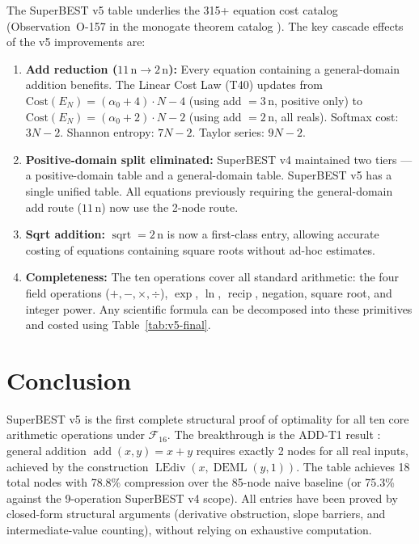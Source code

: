 \documentclass[12pt,a4paper]{article}
\theoremstyle{definition}
\newcommand{\DEML}{\operatorname{DEML}}
\newcommand{\LEdiv}{\operatorname{LEdiv}}
\newcommand{\recip}{\operatorname{recip}}
\newcommand{\addop}{\operatorname{add}}
\newcommand{\sqrtop}{\operatorname{sqrt}}
\begin{document}
The SuperBEST v5 table underlies the 315+ equation cost catalog
(Observation~O-157 in the monogate theorem catalog \cite{MonogateCatalog}).
The key cascade effects of the v5 improvements are:

\begin{enumerate}
\item \textbf{Add reduction ($11\,\text{n} \to 2\,\text{n}$):}
  Every equation containing a general-domain addition benefits.
  The Linear Cost Law (T40) updates from
  $\mathrm{Cost}(E_N) = (\alpha_0 + 4) \cdot N - 4$ (using add $= 3\,\text{n}$, positive only)
  to
  $\mathrm{Cost}(E_N) = (\alpha_0 + 2) \cdot N - 2$ (using add $= 2\,\text{n}$, all reals).
  Softmax cost: $3N - 2$.  Shannon entropy: $7N - 2$.  Taylor series: $9N - 2$.

\item \textbf{Positive-domain split eliminated:}
  SuperBEST v4 maintained two tiers --- a positive-domain table and a general-domain table.
  SuperBEST v5 has a single unified table.
  All equations previously requiring the general-domain add route ($11\,\text{n}$)
  now use the 2-node route.

\item \textbf{Sqrt addition:}
  $\sqrtop = 2\,\text{n}$ is now a first-class entry, allowing accurate costing
  of equations containing square roots without ad-hoc estimates.

\item \textbf{Completeness:}
  The ten operations cover all standard arithmetic: the four field operations
  ($+, -, \times, \div$), $\exp$, $\ln$, $\recip$, negation, square root, and
  integer power.  Any scientific formula can be decomposed into these primitives
  and costed using Table~\ref{tab:v5-final}.
\end{enumerate}

\section*{Conclusion}

SuperBEST v5 is the first complete structural proof of optimality for all ten
core arithmetic operations under $\mathcal{F}_{16}$.
The breakthrough is the ADD-T1 result \cite{ADDT1}: general addition
$\addop(x,y) = x + y$ requires exactly 2 nodes for all real inputs,
achieved by the construction $\LEdiv(x, \DEML(y, 1))$.
The table achieves 18 total nodes with 78.8\% compression over the 85-node naive baseline
(or 75.3\% against the 9-operation SuperBEST v4 scope).
All entries have been proved by closed-form structural arguments
(derivative obstruction, slope barriers, and intermediate-value counting),
without relying on exhaustive computation.
\end{document}
